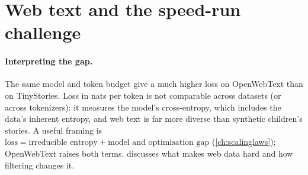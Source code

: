 \section{Web text and the speed-run challenge}\label{sec:proj1:owt}

\paragraph{Interpreting the gap.} The same model and token budget give a much higher loss on
OpenWebText than on TinyStories. Loss in nats per token is not comparable across datasets (or
across tokenizers): it measures the model's cross-entropy, which includes the data's inherent
entropy, and web text is far more diverse than synthetic children's stories. A useful framing is
$\text{loss} = \text{irreducible entropy} + \text{model and optimisation gap}$
(\cref{ch:scalinglaws}); OpenWebText raises both terms.  discusses what makes web
data hard and how filtering changes it.

